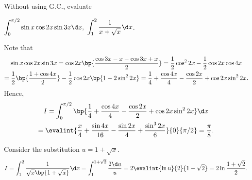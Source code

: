 \begin{problem}
    Without using G.C., evaluate
    \begin{tasks}
        \task $\displaystyle\int_0^{\pi/2} \sin x \cos 2x \sin 3x \d x,$
        \task $\displaystyle\int_1^2 \frac1{x + \sqrt{x}} \d x$.
    \end{tasks}
\end{problem}
\begin{solution}
    \begin{ppart}
        Note that 
        \begin{gather*}
            \sin x \cos 2x \sin 3x = \cos 2x \bp{\frac{\cos{3x - x} - \cos{3x + x}}{2}} = \frac12 \cos^2 2x - \frac12 \cos 2x \cos 4x \\
            = \frac12 \bp{\frac{1 + \cos 4x}{2}} - \frac12 \cos 2x \bp{1 - 2 \sin^2 2x} = \frac14 + \frac{\cos 4x}{4} - \frac{\cos 2x}{2} + \cos 2x \sin^2 2x.
        \end{gather*}
        Hence,
        \begin{gather*}
            I = \int_0^{\pi/2} \bp{\frac14 + \frac{\cos 4x}{4} - \frac{\cos 2x}{2} + \cos 2x \sin^2 2x} \d x\\
            = \evalint{\frac{x}4 + \frac{\sin 4x}{16} - \frac{\sin 2x}{4} + \frac{\sin^3 2x}{6}}{0}{\pi/2} = \frac\pi8.
        \end{gather*}
    \end{ppart}
    \begin{ppart}
        Consider the substitution $u = 1 + \sqrt{x}$. \[I = \int_1^2 \frac1{\sqrt{x} \bp{1 + \sqrt{x}}} \d x = \int_1^{1 + \sqrt2} \frac{2 \d u}{u} = 2 \evalint{\ln u}{2}{1 + \sqrt2} = 2\ln \frac{1 + \sqrt 2}2.\]
    \end{ppart}
\end{solution}

